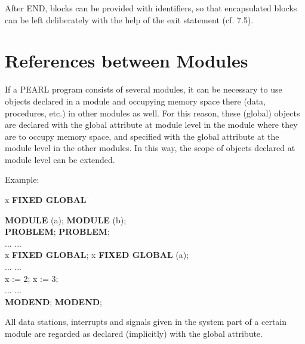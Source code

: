 After END, blocks can be provided with identifiers, so that encapsulated
blocks can be left deliberately with the help of the exit statement
(cf. 7.5).

\section{References between Modules}  %
\label{sec_references_module}

If a PEARL program consists of several modules, it can be necessary to
use objects declared in a module and occupying memory space there (data,
procedures, etc.) in other modules as well. For this reason, these
(global) objects are declared with the global attribute at module level
in the module where they are to occupy memory space, and specified with
the global attribute at the module level in the other modules. In this
way, the scope of objects declared at module level can be extended.

Example:

\begin{tabbing}
 x {\bf FIXED GLOBAL} \hspace{2cm} \= \kill

{\bf MODULE} (a);                  \> {\bf MODULE} (b); \\
{\bf PROBLEM};                     \> {\bf PROBLEM};\\
\x ...                             \> \x ...\\
 x {\bf FIXED GLOBAL}; \>  x {\bf FIXED GLOBAL} (a);\\
\x ...                             \> \x ...\\
\x x := 2;                         \> \x x := 3;\\
\x ...                             \> \x ...\\
{\bf MODEND};                      \> {\bf MODEND};
\end{tabbing}

All data stations, interrupts and signals given in the system part of a
certain module are regarded as declared (implicitly) with the global
attribute.

